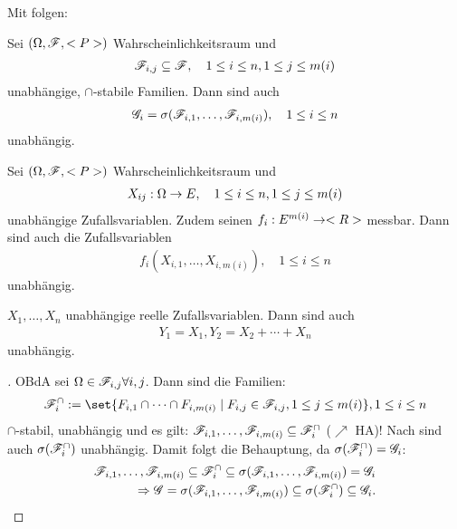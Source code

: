 Mit  folgen:
\begin{conclusion}
	Sei $(\Omega,\mathscr F,<P>)$ Wahrscheinlichkeitsraum und
	\begin{align*}
		\mathscr F_{i,j} \subseteq \mathscr F, \quad 1 \le i \le n, 1 \le j \le m(i)
	\end{align*}
	unabhängige, $\cap$-stabile Familien.
	Dann sind auch
	\begin{align*}
		\mathscr{G}_i = \sigma(\mathscr F_{i,1}, \dots , \mathscr F_{i,m(i)}), \quad 1 \le i \le n
	\end{align*}
	unabhängig.
\end{conclusion}
\begin{conclusion}
	Sei $(\Omega,\mathscr F,<P>)$ Wahrscheinlichkeitsraum und
	\begin{align*}
		X_{ij}: \Omega \to E, \quad 1 \le i \le n, 1 \le j \le m(i)
	\end{align*}
	unabhängige Zufallsvariablen. Zudem seinen $f_i: E^{m(i)} \to <R>$ messbar. Dann sind auch die Zufallsvariablen
	\begin{align*}
		f_i(X_{i,1}, \dots, X_{i,m(i)}), \quad 1 \le i \le n
	\end{align*}
	unabhängig.
\end{conclusion}
\begin{example}
	$X_1, \dots, X_n$ unabhängige reelle Zufallsvariablen. Dann sind auch
	\begin{align*}
	Y_1 = X_1, Y_2 = X_2 + \cdots + X_n
	\end{align*}
	unabhängig.
\end{example}
\begin{proof}[]
	OBdA sei $\Omega \in \mathscr F_{i,j} \forall i,j$. Dann sind die Familien:
	\begin{align*}
		\F_i^{\cap} := \set{F_{i,1} \cap \dots \cap F_{i,m(i)} \mid F_{i,j} \in \F_{i,j}, 1 \le j \le m(i)}, 1 \le i \le n
	\end{align*}
	$\cap$-stabil, unabhängig und es gilt: $\mathscr F_{i,1}, \dots, \mathscr F_{i,m(i)} \subseteq \mathscr F_i^{\cap}$ ($\nearrow$ HA)! Nach  sind auch $\sigma(\mathscr F_i^{\cap})$ unabhängig. Damit folgt die Behauptung, da $\sigma(\mathscr F_i^{\cap}) = \mathscr{G}_i$:
	\begin{align*}
		\mathscr F_{i,1}, \dots, \mathscr F_{i,m(i)} \subseteq \mathscr F_i^{\cap} \subseteq \sigma(\mathscr F_{i,1}, \dots, \mathscr F_{i,m(i)}) = \mathscr{G}_i\\
		\Rightarrow \mathscr{G} = \sigma(\mathscr F_{i,1}, \dots, \mathscr F_{i,m(i)}) \subseteq \sigma(\mathscr F_i^{\cap}) \subseteq \mathscr{G}_i.
	\end{align*}
\end{proof}
